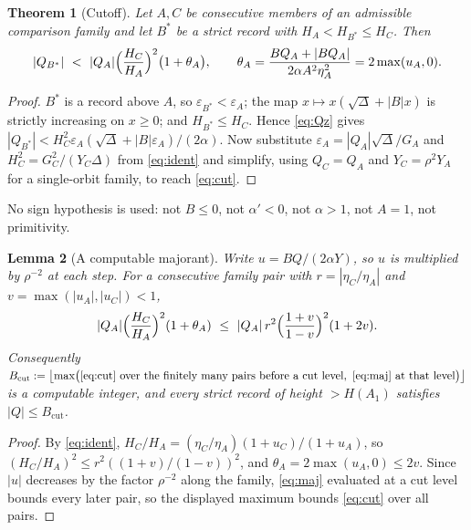 \documentclass[11pt]{article}
\newtheorem{theorem}{Theorem}[section]
\newtheorem{lemma}[theorem]{Lemma}
\theoremstyle{definition}
\theoremstyle{remark}
\begin{document}
\begin{theorem}[Cutoff]\label{thm:cutoff}
Let $A,C$ be consecutive members of an admissible comparison family and let $B^{*}$ be a strict
record with $H_A<H_{B^{*}}\le H_C$. Then
\begin{equation}\label{eq:cut}
|Q_{B^{*}}|\ <\ |Q_A|\Bigl(\frac{H_C}{H_A}\Bigr)^{2}\bigl(1+\theta_A\bigr),
\qquad
\theta_A=\frac{BQ_A+|BQ_A|}{2\alpha A^2\eta_A^2}=2\max(u_A,0).
\end{equation}
\end{theorem}

\begin{proof}
$B^{*}$ is a record above $A$, so $\varepsilon_{B^{*}}<\varepsilon_A$; the map
$x\mapsto x(\sqrt\Delta+|B|x)$ is strictly increasing on $x\ge0$; and $H_{B^{*}}\le H_C$.
Hence \eqref{eq:Qz} gives
$|Q_{B^{*}}|<H_C^{2}\varepsilon_A(\sqrt\Delta+|B|\varepsilon_A)/(2\alpha)$. Now substitute
$\varepsilon_A=|Q_A|\sqrt\Delta/G_A$ and $H_C^2=G_C^2/(Y_C\Delta)$ from \eqref{eq:ident} and
simplify, using $Q_C=Q_A$ and $Y_C=\rho^2Y_A$ for a single-orbit family, to reach
\eqref{eq:cut}.
\end{proof}

No sign hypothesis is used: not $B\le0$, not $\alpha'<0$, not $\alpha>1$, not $A=1$, not
primitivity.

\begin{lemma}[A computable majorant]\label{lem:tailbound}
Write $u=BQ/(2\alpha Y)$, so $u$ is multiplied by $\rho^{-2}$ at each step. For a consecutive
family pair with $r=|\eta_C/\eta_A|$ and $v=\max(|u_A|,|u_C|)<1$,
\begin{equation}\label{eq:maj}
|Q_A|\Bigl(\frac{H_C}{H_A}\Bigr)^{2}(1+\theta_A)
\ \le\ |Q_A|\,r^{2}\Bigl(\frac{1+v}{1-v}\Bigr)^{2}(1+2v).
\end{equation}
Consequently
$B_{\mathrm{cut}}:=\bigl\lfloor\max\bigl(\text{\eqref{eq:cut} over the finitely many pairs
before a cut level},\ \text{\eqref{eq:maj} at that level}\bigr)\bigr\rfloor$
is a computable integer, and every strict record of height $>H(A_1)$ satisfies
$|Q|\le B_{\mathrm{cut}}$.
\end{lemma}

\begin{proof}
By \eqref{eq:ident}, $H_C/H_A=(\eta_C/\eta_A)(1+u_C)/(1+u_A)$, so
$(H_C/H_A)^2\le r^2((1+v)/(1-v))^2$, and $\theta_A=2\max(u_A,0)\le 2v$. Since $|u|$ decreases
by the factor $\rho^{-2}$ along the family, \eqref{eq:maj} evaluated at a cut level bounds every
later pair, so the displayed maximum bounds \eqref{eq:cut} over all pairs.
\end{proof}
\end{document}
